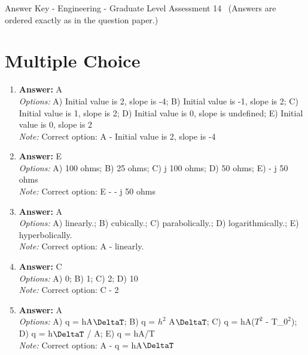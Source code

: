 \documentclass[12pt]{article}
\begin{document}
\begin{center}
Answer Key - Engineering - Graduate Level Assessment 14 \
\small (Answers are ordered exactly as in the question paper.)
\end{center}

\section*{Multiple Choice}
\begin{enumerate}[label=\arabic*.]
\item \textbf{Answer:} A
\\ \textit{Options:} A) Initial value is 2, slope is -4; B) Initial value is -1, slope is 2; C) Initial value is 1, slope is 2; D) Initial value is 0, slope is undefined; E) Initial value is 0, slope is 2
\\ \textit{Note:} Correct option: A - Initial value is 2, slope is -4
\item \textbf{Answer:} E
\\ \textit{Options:} A) 100 ohms; B) 25 ohms; C) j 100 ohms; D) 50 ohms; E) - j 50 ohms
\\ \textit{Note:} Correct option: E - - j 50 ohms
\item \textbf{Answer:} A
\\ \textit{Options:} A) linearly.; B) cubically.; C) parabolically.; D) logarithmically.; E) hyperbolically.
\\ \textit{Note:} Correct option: A - linearly.
\item \textbf{Answer:} C
\\ \textit{Options:} A) 0; B) 1; C) 2; D) 10
\\ \textit{Note:} Correct option: C - 2
\item \textbf{Answer:} A
\\ \textit{Options:} A) q = hA\ensuremath{\DeltaT}; B) q = $h^2$ A\ensuremath{\DeltaT}; C) q = hA($T^2$ - T\_$0^2$); D) q = h\ensuremath{\DeltaT} / A; E) q = hA/T
\\ \textit{Note:} Correct option: A - q = hA\ensuremath{\DeltaT}
\end{enumerate}
\end{document}
